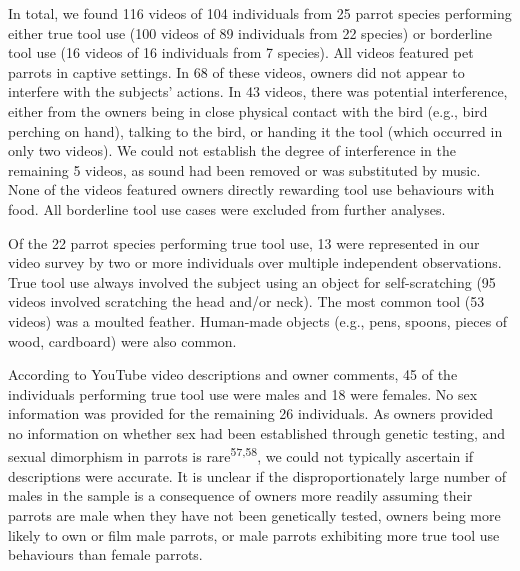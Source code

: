 \documentclass[
  man,floatsintext]{apa6}
\begin{document}
In total, we found 116 videos of 104 individuals from 25 parrot species performing either true tool use (100 videos of 89 individuals from 22 species) or borderline tool use (16 videos of 16 individuals from 7 species). All videos featured pet parrots in captive settings. In 68 of these videos, owners did not appear to interfere with the subjects' actions. In 43 videos, there was potential interference, either from the owners being in close physical contact with the bird (e.g., bird perching on hand), talking to the bird, or handing it the tool (which occurred in only two videos). We could not establish the degree of interference in the remaining 5 videos, as sound had been removed or was substituted by music. None of the videos featured owners directly rewarding tool use behaviours with food. All borderline tool use cases were excluded from further analyses.

Of the 22 parrot species performing true tool use, 13 were represented in our video survey by two or more individuals over multiple independent observations. True tool use always involved the subject using an object for self-scratching (95 videos involved scratching the head and/or neck). The most common tool (53 videos) was a moulted feather. Human-made objects (e.g., pens, spoons, pieces of wood, cardboard) were also common.

According to YouTube video descriptions and owner comments, 45 of the individuals performing true tool use were males and 18 were females. No sex information was provided for the remaining 26 individuals. As owners provided no information on whether sex had been established through genetic testing, and sexual dimorphism in parrots is rare\textsuperscript{57,58}, we could not typically ascertain if descriptions were accurate. It is unclear if the disproportionately large number of males in the sample is a consequence of owners more readily assuming their parrots are male when they have not been genetically tested, owners being more likely to own or film male parrots, or male parrots exhibiting more true tool use behaviours than female parrots.
\end{document}
